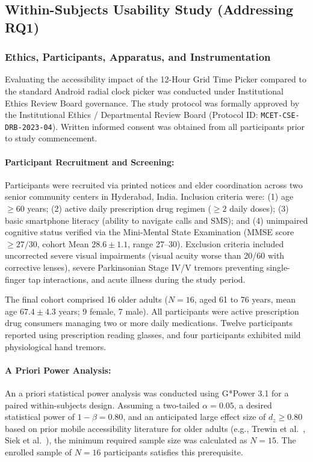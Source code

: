 \documentclass[11pt,a4paper]{article}
\begin{document}
\subsection{Within-Subjects Usability Study (Addressing RQ1)}
\label{sec:usability_study}

\subsubsection{Ethics, Participants, Apparatus, and Instrumentation}
Evaluating the accessibility impact of the 12-Hour Grid Time Picker compared to the standard Android radial clock picker was conducted under Institutional Ethics Review Board governance. The study protocol was formally approved by the Institutional Ethics / Departmental Review Board (Protocol ID: \texttt{MCET-CSE-DRB-2023-04}). Written informed consent was obtained from all participants prior to study commencement.

\paragraph{Participant Recruitment and Screening:} Participants were recruited via printed notices and elder coordination across two senior community centers in Hyderabad, India. Inclusion criteria were: (1) age $\ge 60$ years; (2) active daily prescription drug regimen ($\ge 2$ daily doses); (3) basic smartphone literacy (ability to navigate calls and SMS); and (4) unimpaired cognitive status verified via the Mini-Mental State Examination (MMSE score $\ge 27/30$, cohort Mean $28.6 \pm 1.1$, range 27--30). Exclusion criteria included uncorrected severe visual impairments (visual acuity worse than 20/60 with corrective lenses), severe Parkinsonian Stage IV/V tremors preventing single-finger tap interactions, and acute illness during the study period.

The final cohort comprised 16 older adults ($N=16$, aged 61 to 76 years, mean age $67.4 \pm 4.3$ years; 9 female, 7 male). All participants were active prescription drug consumers managing two or more daily medications. Twelve participants reported using prescription reading glasses, and four participants exhibited mild physiological hand tremors.

\paragraph{A Priori Power Analysis:} An a priori statistical power analysis was conducted using G*Power 3.1 for a paired within-subjects design. Assuming a two-tailed $\alpha = 0.05$, a desired statistical power of $1 - \beta = 0.80$, and an anticipated large effect size of $d_z \ge 0.80$ based on prior mobile accessibility literature for older adults (e.g., Trewin et al.~\cite{trewin2013physical}, Siek et al.~\cite{siek2006fat}), the minimum required sample size was calculated as $N = 15$. The enrolled sample of $N = 16$ participants satisfies this prerequisite.
\end{document}
